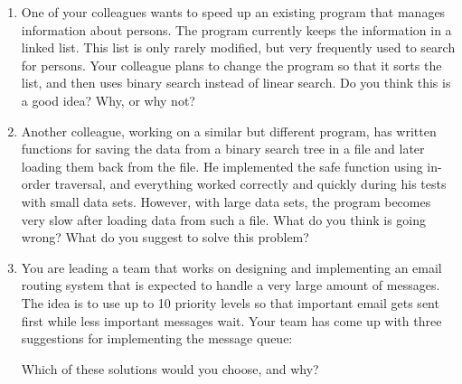 \documentclass[a4paper]{article}
\begin{document}
\begin{enumerate}
\item
  One of your colleagues wants to speed up an existing program that manages information about persons.
  The program currently keeps the information in a linked list.
  This list is only rarely modified, but very frequently used to search for persons.
  Your colleague plans to change the program so that it sorts the list, and then uses binary search instead of linear search.
  Do you think this is a good idea?
  Why, or why not?
\item
  Another colleague, working on a similar but different program, has written functions for saving the data from a binary search tree in a file and later loading them back from the file.
  He implemented the safe function using in-order traversal, and everything worked correctly and quickly during his tests with small data sets.
  However, with large data sets, the program becomes very slow after loading data from such a file.
  What do you think is going wrong?
  What do you suggest to solve this problem?
\item
  You are leading a team that works on designing and implementing an email routing system that is expected to handle a very large amount of messages.
  The idea is to use up to 10 priority levels so that important email gets sent first while less important messages wait.
  Your team has come up with three suggestions for implementing the message queue:
  Which of these solutions would you choose, and why?
\end{enumerate}
\end{document}
